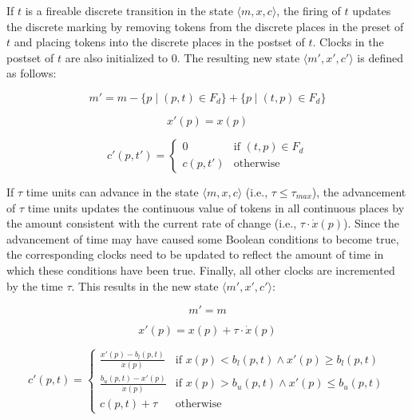 \documentclass[11pt,times]{article}
\begin{document}
If $t$ is a fireable discrete transition in
the state $\langle m,x,c \rangle$, the firing of $t$ updates the discrete 
marking by removing tokens from the discrete places in the preset of $t$ and 
placing tokens into the discrete places in the postset of $t$.  Clocks in the
postset of $t$ are also initialized to 0.  The resulting new state 
$\langle m',x',c' \rangle$ is defined as follows:

\[m' = m - \{p \mid (p, t) \in F_d\} + \{p \mid (t, p) \in F_d\}
\]


\[x'(p) = x(p)\]

\[c'(p, t') = \left\{ \begin{array}{ll}
  0 & \mbox{if $(t,p) \in F_d$}\\
  c(p, t') & \mbox{otherwise}
\end{array}
\right. \]


If $\tau$ time units can advance in the state $\langle m,x,c \rangle$
(i.e., $\tau \leq \tau_{max}$), the advancement of $\tau$ time units updates
the continuous value of tokens in all continuous places by the amount
consistent with the current rate of change (i.e., $\tau \cdot \dot{x}(p)$).
Since the advancement of time may have caused some Boolean conditions to
become true, the corresponding clocks need to be updated to reflect the 
amount of time in which these conditions have been true.  Finally, all other
clocks are incremented by the time $\tau$.  This results
in the new state $\langle m',x',c' \rangle$: 

\[m' = m\]


\[x'(p) =  x(p) + \tau \cdot \dot{x}(p) \]

\[c'(p, t) = \left\{
  \begin{array}{ll}
    \frac{x'(p) - b_l(p, t)}{\dot{x}(p)} & \mbox{if $x(p) < b_l(p, t)
    \wedge x'(p) \geq b_l(p, t)$}\\
    \frac{b_u(p, t) - x'(p)}{\dot{x}(p)} & \mbox{if $x(p) > b_u(p, t)
    \wedge x'(p) \leq b_u(p, t)$}\\
    c(p, t) + \tau & \mbox{otherwise}
  \end{array}
  \right.
\]
\end{document}
